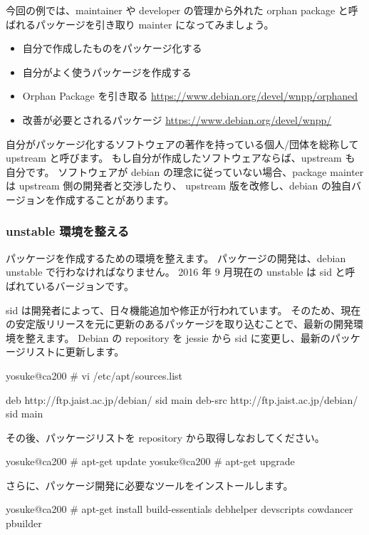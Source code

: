 \documentclass[mingoth,a4paper]{jsarticle}
\begin{document}
今回の例では、maintainer や developer の管理から外れた orphan package と呼ばれるパッケージを引き取り mainter になってみましょう。

\begin{itemize}
    \item{ 自分で作成したものをパッケージ化する }
    \item{ 自分がよく使うパッケージを作成する }
    \item{ Orphan Package を引き取る \url{https://www.debian.org/devel/wnpp/orphaned}  }
    \item{ 改善が必要とされるパッケージ \url{https://www.debian.org/devel/wnpp/} }
\end{itemize}

自分がパッケージ化するソフトウェアの著作を持っている個人/団体を総称して upstream と呼びます。
もし自分が作成したソフトウェアならば、upstream も自分です。
ソフトウェアが debian の理念に従っていない場合、package mainter は upstream 側の開発者と交渉したり、
upstream 版を改修し、debian の独自バージョンを作成することがあります。

\subsubsection{ unstable 環境を整える }
パッケージを作成するための環境を整えます。 
パッケージの開発は、debian unstable で行わなければなりません。
2016 年 9 月現在の unstable は sid と呼ばれているバージョンです。

sid は開発者によって、日々機能追加や修正が行われています。
そのため、現在の安定版リリースを元に更新のあるパッケージを取り込むことで、最新の開発環境を整えます。
Debian の repository を jessie から sid に変更し、最新のパッケージリストに更新します。

\begin{commandline}
yosuke@ca200 # vi /etc/apt/sources.list

deb http://ftp.jaist.ac.jp/debian/ sid main
deb-src http://ftp.jaist.ac.jp/debian/ sid main
\end{commandline}

その後、パッケージリストを repository から取得しなおしてください。

\begin{commandline}
yosuke@ca200 # apt-get update 
yosuke@ca200 # apt-get upgrade
\end{commandline}

さらに、パッケージ開発に必要なツールをインストールします。
\begin{commandline}
yosuke@ca200 # apt-get install build-essentials debhelper devscripts cowdancer pbuilder 
\end{commandline}
\end{document}
